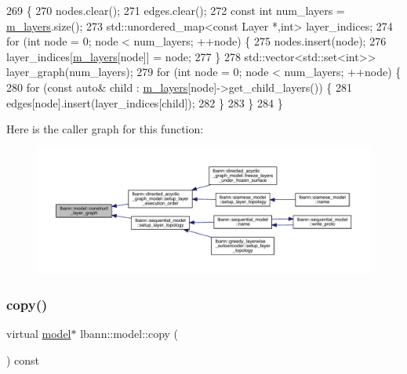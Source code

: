 \begin{DoxyCode}
269                                                                         \{
270   nodes.clear();
271   edges.clear();
272   \textcolor{keyword}{const} \textcolor{keywordtype}{int} num\_layers = \hyperlink{classlbann_1_1model_a0229fc226ec163d1411548446104569d}{m\_layers}.size();
273   std::unordered\_map<const Layer *,int> layer\_indices;
274   \textcolor{keywordflow}{for} (\textcolor{keywordtype}{int} node = 0; node < num\_layers; ++node) \{
275     nodes.insert(node);
276     layer\_indices[\hyperlink{classlbann_1_1model_a0229fc226ec163d1411548446104569d}{m\_layers}[node]] = node;
277   \}
278   std::vector<std::set<int>> layer\_graph(num\_layers);
279   \textcolor{keywordflow}{for} (\textcolor{keywordtype}{int} node = 0; node < num\_layers; ++node) \{
280     \textcolor{keywordflow}{for} (\textcolor{keyword}{const} \textcolor{keyword}{auto}& child : \hyperlink{classlbann_1_1model_a0229fc226ec163d1411548446104569d}{m\_layers}[node]->get\_child\_layers()) \{
281       edges[node].insert(layer\_indices[child]);
282     \}
283   \}
284 \}
\end{DoxyCode}
Here is the caller graph for this function\+:\nopagebreak
\begin{figure}[H]
\begin{center}
\leavevmode
\includegraphics[width=350pt]{classlbann_1_1model_aef7a4775c70f96610bfc5a4605b946a5_icgraph}
\end{center}
\end{figure}
\mbox{\label{classlbann_1_1model_aacd024c11f0897b33a7e7838b9433ba2}} 
\subsubsection{\texorpdfstring{copy()}{copy()}}
{\footnotesize\ttfamily virtual \hyperlink{classlbann_1_1model}{model}$\ast$ lbann\+::model\+::copy (\begin{DoxyParamCaption}{ }\end{DoxyParamCaption}) const\hspace{0.3cm}{\ttfamily [pure virtual]}}

